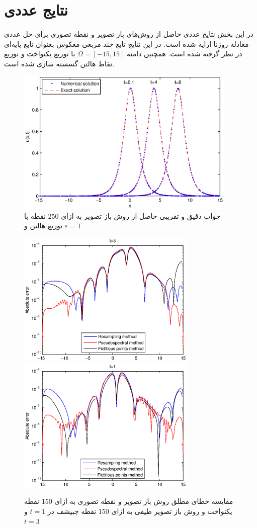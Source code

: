 \section{نتایج عددی}

در این بخش نتایج عددی حاصل از روش‌های باز تصویر و نقطه تصوری برای حل عددی معادله روزنا ارایه شده است. در این نتایج تابع چند مربعی معکوس بعنوان تابع پایه‌ای در نظر گرفته شده است. همچنین دامنه
$\Omega=[-15,15]$
با توزیع یکنواخت و توزیع نقاط هالتن گسسته سازی شده است.
%
\begin{figure}
\centerline{
\includegraphics[height=7cm]{figure21.eps}} \caption{
جواب دقیق و تقریبی حاصل از روش باز تصویر به ازای 250 نقطه با توزیع هالتن و 
$\varepsilon=1$ } 
\label{fig:randpo}
\end{figure}
%
%
\begin{figure}
\centerline{
\includegraphics[height=6.5cm]{figure22.eps}
\includegraphics[height=6.5cm]{figure23.eps}} \caption{
مقایسه خطای مطلق روش باز تصویر و نقطه تصوری به ازای 150 نقطه یکنواخت و روش باز تصویر طیفی به ازای 150 نقطه چبیشف در 
$t=1$
و
$t=3$} \label{fig:absolute}
\end{figure}
